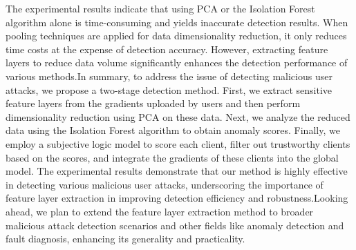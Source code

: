 \documentclass[conference]{IEEEtran}
\begin{document}
The experimental results indicate that using PCA or the Isolation Forest algorithm alone is time-consuming and yields inaccurate detection results. When pooling techniques\cite{betterTogether} are applied for data dimensionality reduction, it only reduces time costs at the expense of detection accuracy. However, extracting feature layers to reduce data volume significantly enhances the detection performance of various methods.In summary, to address the issue of detecting malicious user attacks, we propose a two-stage detection method. First, we extract sensitive feature layers from the gradients uploaded by users and then perform dimensionality reduction using PCA on these data. Next, we analyze the reduced data using the Isolation Forest algorithm to obtain anomaly scores. Finally, we employ a subjective logic model to score each client, filter out trustworthy clients based on the scores, and integrate the gradients of these clients into the global model. The experimental results demonstrate that our method is highly effective in detecting various malicious user attacks, underscoring the importance of feature layer extraction in improving detection efficiency and robustness.Looking ahead, we plan to extend the feature layer extraction method to broader malicious attack detection scenarios and other fields like anomaly detection and fault diagnosis, enhancing its generality and practicality.


\end{document}
